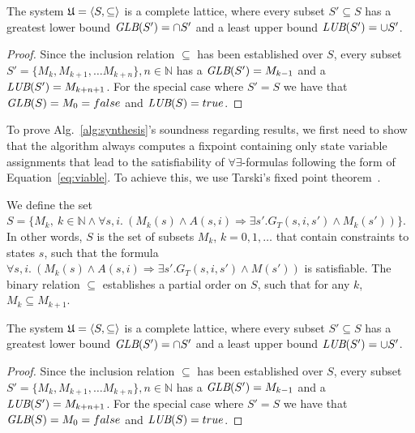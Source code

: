 \iffalse
The system $\mathfrak{U} = \langle S, \subseteq \rangle$ is a complete lattice, where every subset $S' \subseteq S$ has a greatest lower bound  $\textit {GLB}(S') = \cap S'$  and a least upper bound $\textit {LUB}(S') = \cup S'$.
\label{lem:altlattice}

\begin{proof}
Since the inclusion relation $\subseteq$ has been established over $S$, every subset $S' = \{M_k, M_{k+1}, \ldots M_{k+n}\}, n \in \mathbb{N}$ has a $\textit {GLB}(S') = M_{k-1}$ and a $\textit {LUB}(S') = M_{k+n+1}$. For the special case where $S' = S$ we have that $\textit {GLB}(S) = M_0 = false$ and $\textit {LUB}(S) = true$.
\end{proof}

\label{sec:soundness}
To prove Alg.~\ref{alg:synthesis}'s soundness regarding results, we first need to show that the algorithm always computes a fixpoint containing only state variable assignments that lead to the satisfiability of $\forall\exists$-formulas following the form of Equation~\ref{eq:viable}. To achieve this, we
use Tarski's fixed point theorem~\cite{tarski1955lattice}.



We define the set $S = \{M_k, \ k \in \mathbb{N} \land \forall s, i. \ (M_k(s) \land A(s,i) \Rightarrow \exists s'. G_T(s,i,s') \land M_k(s'))\}$. In other words, $S$ is the set of subsets $M_k$, $k = 0, 1 , \ldots$ that contain constraints to states $s$, such that the formula $\forall s, i. \ (M_k(s) \land A(s,i) \Rightarrow \exists s'. G_T(s,i,s') \land M(s'))$ is satisfiable. The binary relation $\subseteq$ establishes a partial order on $S$, such that for any $k$, $M_k \subseteq M_{k+1}$.

\begin{lemma} The system $\mathfrak{U} = \langle S, \subseteq \rangle$ is a complete lattice, where every subset $S' \subseteq S$ has a greatest lower bound  $\textit {GLB}(S') = \cap S'$  and a least upper bound $\textit {LUB}(S') = \cup S'$.
\label{lem:altlattice}
\end{lemma}
\begin{proof}
Since the inclusion relation $\subseteq$ has been established over $S$, every subset $S' = \{M_k, M_{k+1}, \ldots M_{k+n}\}, n \in \mathbb{N}$ has a $\textit {GLB}(S') = M_{k-1}$ and a $\textit {LUB}(S') = M_{k+n+1}$. For the special case where $S' = S$ we have that $\textit {GLB}(S) = M_0 = false$ and $\textit {LUB}(S) = true$.
\end{proof}


